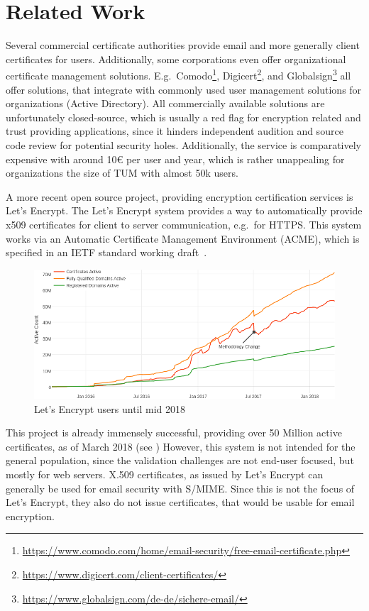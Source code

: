 \chapter{Related Work}\label{ch:relatedWork}
Several commercial certificate authorities provide email and more generally client certificates for users.
Additionally, some corporations even offer organizational certificate management solutions.
E.g.\ Comodo\footnote{\url{https://www.comodo.com/home/email-security/free-email-certificate.php}},
Digicert\footnote{\url{https://www.digicert.com/client-certificates/}}, and
Globalsign\footnote{\url{https://www.globalsign.com/de-de/sichere-email/}} all offer solutions, that integrate with
commonly used user management solutions for organizations (Active Directory).
All commercially available solutions are unfortunately closed-source, which is usually a red flag for encryption related
and trust providing applications, since it hinders independent audition and source code review for potential security
holes.
Additionally, the service is comparatively expensive with around 10€ per user and year, which is rather unappealing for
organizations the size of TUM with almost 50k users.

A more recent open source project, providing encryption certification services is Let's Encrypt.
The Let's Encrypt system provides a way to automatically provide x509 certificates for client to server communication,
e.g.\ for HTTPS\@.
This system works via an Automatic Certificate Management Environment (ACME), which is specified in an IETF standard
working draft~\cite{letsencrypteacme}.

\begin{figure}[hb]
    \centering
    \includegraphics[width=.905\textwidth]{figures/letsencryptusers.png}
    \caption{Let's Encrypt users until mid 2018~\cite{letsencryptstats}}
    \label{fig:letsencrypt}
\end{figure}

This project is already immensely successful, providing over 50 Million active certificates, as of March 2018 (see
)
However, this system is not intended for the general population, since the validation challenges are not end-user
focused, but mostly for web servers.
X.509 certificates, as issued by Let's Encrypt can generally be used for email security with S/MIME\@.
Since this is not the focus of Let's Encrypt, they also do not issue certificates, that would be usable for email
encryption.

